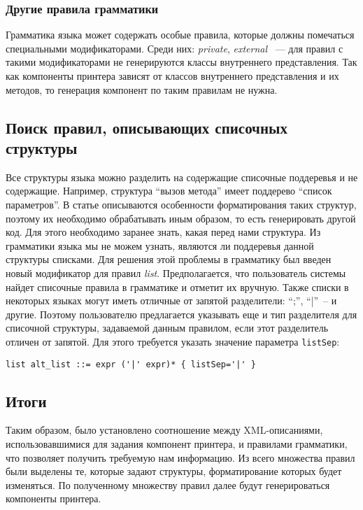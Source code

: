 \subsubsection{Другие правила грамматики}
Грамматика языка может содержать особые правила, которые должны помечаться специальными модификаторами.
Среди них: \emph{private}, \emph{external} ~--- для правил с такими модификаторами не генерируются классы внутреннего представления.
Так как компоненты принтера зависят от классов внутреннего представления и их методов, то генерация компонент по таким правилам не нужна.

\subsection{Поиск правил, описывающих списочных структуры}
Все структуры языка можно разделить на содержащие списочные поддеревья и не содержащие.
Например, структура ``вызов метода'' имеет поддерево ``список параметров''.
В статье \cite{paper:while} описываются особенности форматирования таких структур, поэтому их необходимо обрабатывать иным образом, то есть генерировать другой код.
Для этого необходимо заранее знать, какая перед нами структура.
Из грамматики языка мы не можем узнать, являются ли поддеревья данной структуры списками.
Для решения этой проблемы в грамматику был введен новый модификатор для правил \emph{list}.
Предполагается, что пользователь системы найдет списочные правила в грамматике и отметит их вручную.
Также списки в некоторых языках могут иметь отличные от запятой разделители: ``;'', ``|''~-- и другие.
Поэтому пользователю предлагается указывать еще и тип разделителя для списочной структуры, задаваемой данным правилом, если этот разделитель отличен от запятой.
Для этого требуется указать значение параметра \lstinline{listSep}:

{
\begin{lstlisting}
list alt_list ::= expr ('|' expr)* { listSep='|' }
\end{lstlisting}
}
\subsection{Итоги}
Таким образом, было установлено соотношение между XML-описаниями, использовавшимися для задания компонент принтера, и правилами грамматики, что позволяет получить требуемую нам информацию.
Из всего множества правил были выделены те, которые задают структуры, форматирование которых будет изменяться.
По полученному множеству правил далее будут генерироваться компоненты принтера.
